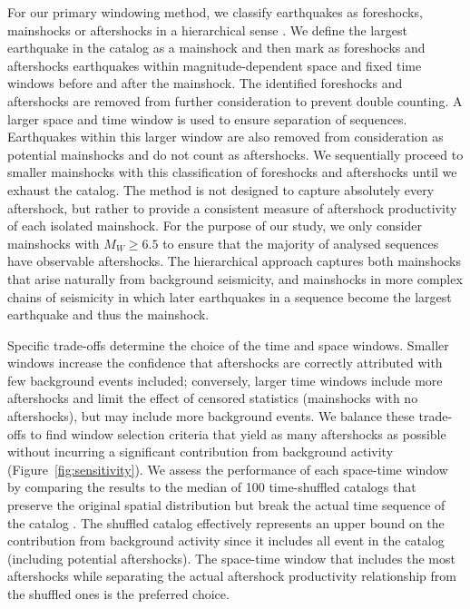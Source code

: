 \documentclass[draft, jgrga]{agujournal2018}
\begin{document}
For our primary windowing method, we classify earthquakes as foreshocks, mainshocks or aftershocks in a hierarchical sense \citep[following][]{felzer2006decay, Brodsky2011TheForeshocks, Wetzler2016, Garza-Giron2018Mainshock-AftershockRegions}. We define the largest earthquake in the catalog as a mainshock and then mark as foreshocks and aftershocks earthquakes within magnitude-dependent space and fixed time windows before and after the mainshock. The identified foreshocks and aftershocks are removed from further consideration to prevent double counting. A larger space and time window is used to ensure separation of sequences. Earthquakes within this larger window are also removed from consideration as potential mainshocks and do not count as aftershocks. We sequentially proceed to smaller mainshocks with this classification of foreshocks and aftershocks until we exhaust the catalog. The method is not designed to capture absolutely every aftershock, but rather to provide a consistent measure of aftershock productivity of each isolated mainshock. For the purpose of our study, we only consider mainshocks with $M_W\ge6.5$ to ensure that the majority of analysed sequences have observable aftershocks. The hierarchical approach captures both mainshocks that arise naturally from background seismicity, and mainshocks in more complex chains of seismicity in which later earthquakes in a sequence become the largest earthquake and thus the mainshock.

Specific trade-offs determine the choice of the time and space windows. Smaller windows increase the confidence that aftershocks are correctly attributed with few background events included; conversely, larger time windows include more aftershocks and limit the effect of censored statistics (mainshocks with no aftershocks), but may include more background events. We balance these trade-offs to find window selection criteria that yield as many aftershocks as possible without incurring a significant contribution from background activity (Figure~\ref{fig:sensitivity}). We assess the performance of each space-time window by comparing the results to the median of 100 time-shuffled catalogs that preserve the original spatial distribution but break the actual time sequence of the catalog \citep{Garza-Giron2018Mainshock-AftershockRegions}. The shuffled catalog effectively represents an upper bound on the contribution from background activity since it includes all event in the catalog (including potential aftershocks). The space-time window that includes the most aftershocks while separating the actual aftershock productivity relationship from the shuffled ones is the preferred choice.
\end{document}
